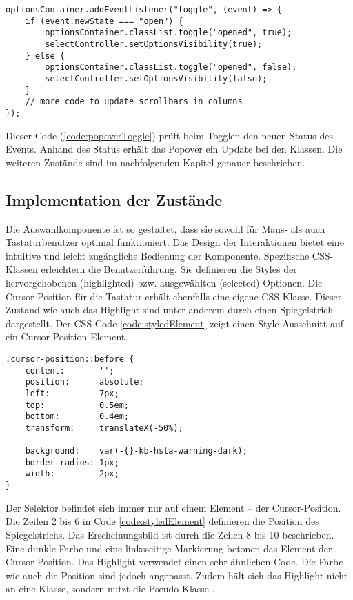 \begin{lstlisting}[style = htmlcssjs, caption = Event-Handling für Popover-Toggle, label = code:popoverToggle]
optionsContainer.addEventListener("toggle", (event) => {
    if (event.newState === "open") {
        optionsContainer.classList.toggle("opened", true);
        selectController.setOptionsVisibility(true);
    } else {
        optionsContainer.classList.toggle("opened", false);
        selectController.setOptionsVisibility(false);
    }
    // more code to update scrollbars in columns
});
\end{lstlisting}

Dieser Code (\ref{code:popoverToggle}) prüft beim Togglen den neuen Status des Events. 
Anhand des Status erhält das Popover ein Update bei den Klassen. 
Die weiteren Zustände sind im nachfolgenden Kapitel genauer beschrieben. 


\subsection{Implementation der Zustände}
\label{sec:implementStates}

Die Auswahlkomponente ist so gestaltet, dass sie sowohl für Maus- als auch Tastaturbenutzer optimal funktioniert. 
Das Design der Interaktionen bietet eine intuitive und leicht zugängliche Bedienung der Komponente. 
Spezifische CSS-Klassen erleichtern die Benutzerführung. 
Sie definieren die Styles der hervorgehobenen (highlighted) bzw. ausgewählten (selected) Optionen. 
Die Cursor-Position für die Tastatur erhält ebenfalls eine eigene CSS-Klasse. 
Dieser Zustand wie auch das Highlight sind unter anderem durch einen Spiegelstrich dargestellt. 
Der CSS-Code \ref{code:styledElement} zeigt einen Style-Ausschnitt auf ein Cursor-Position-Element. 

\begin{lstlisting}[style = htmlcssjs, caption = Spiegelstrich der Cursor-Position, label = code:styledElement]
.cursor-position::before {
    content:       '';
    position:      absolute;
    left:          7px;
    top:           0.5em;
    bottom:        0.4em;
    transform:     translateX(-50%);

    background:    var(-{}-kb-hsla-warning-dark);
    border-radius: 1px;
    width:         2px;
}
\end{lstlisting}

Der Selektor  befindet sich immer nur auf einem Element – der Cursor-Position. 
Die Zeilen 2 bis 6 in Code \ref{code:styledElement} definieren die Position des Spiegelstrichs. 
Das Erscheinungsbild ist durch die Zeilen 8 bis 10 beschrieben. 
Eine dunkle Farbe und eine linksseitige Markierung betonen das Element der Cursor-Position. 
Das Highlight verwendet einen sehr ähnlichen Code. 
Die Farbe wie auch die Position sind jedoch angepasst. 
Zudem hält sich das Highlight nicht an eine Klasse, sondern nutzt die Pseudo-Klasse . 

